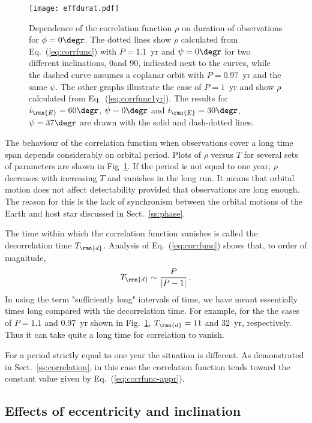 \documentclass[fleqn,usenatbib,useAMS,usedcolumn]{mnras}
\begin{document}
\begin{figure}
  \centering
  \texttt{[image: effdurat.pdf]}
 \caption{Dependence of the correlation function $\rho$ on duration of observations for $\phi=0\degr$. The dotted lines show $\rho$ calculated from Eq.~(\ref{eq:corrfunc}) with $P=1.1$~yr and $\psi=0\degr$ for two different inclinations, 0\degr and 90\degr, indicated next to the curves, while the dashed curve assumes a coplanar orbit with $P=0.97$~yr and the same $\psi$. The other graphs illustrate the case of $P=1$~yr and show $\rho$ calculated from Eq.~(\ref{eq:corrfunc1yr}). The results for $i_\rmn{E}=60\degr$, $\psi=0\degr$ and $i_\rmn{E}=30\degr$, $\psi=37\degr$ are drawn with the solid and dash-dotted lines.}
  \label{fig:effdurat}
\end{figure}

The behaviour of the correlation function when observations cover a long time span depends considerably on orbital period. Plots of $\rho$ versus $T$ for several sets of parameters are shown in Fig~\ref{fig:effdurat}. If the period is not equal to one year, $\rho$ decreases with increasing $T$ and vanishes in the long run. It means that orbital motion does not affect detectability provided that observations are long enough. The reason for this is the lack of synchronism between the orbital motions of the Earth and host star discussed in Sect.~\ref{ss:phase}.

The time within which the correlation function vanishes is called the decorrelation time $T_\rmn{d}$. Analysis of Eq.~(\ref{eq:corrfunc}) shows that, to order of magnitude,
\begin{equation}
 T_\rmn{d}\sim\frac{P}{\left|P-1\right|}\,.
\end{equation}
In using the term "sufficiently long" intervals of time, we have meant essentially times long compared with the decorrelation time. For example, for the the cases of $P=1.1$ and 0.97~yr shown in Fig.~\ref{fig:effdurat}, $T_\rmn{d}=11$ and 32~yr, respectively. Thus it can take quite a long time for correlation to vanish.

For a period strictly equal to one year the situation is different. As demonstrated in Sect.~\ref{ss:correlation}, in this case the correlation function tends toward the constant value given by Eq.~(\ref{eq:corrfunc-appr}).

\subsection{Effects of eccentricity and inclination}
\label{ss:eff-ellipse}
\end{document}
